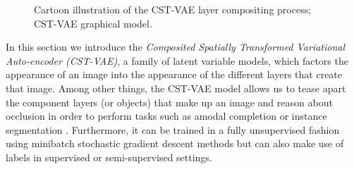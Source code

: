 \label{sec:models}\vspace{-3mm}


\begin{figure}[t]
\begin{center}
\qquad\qquad\qquad
{}\vspace{-5mm}
\end{center}
 \caption{\footnotesize {} Cartoon illustration of the CST-VAE layer compositing process; 
  CST-VAE graphical model.  
 }\vspace{-3mm}
\end{figure}


In this section we introduce the \emph{Composited Spatially Transformed Variational Auto-encoder  (CST-VAE)},
a family of latent variable models, which factors
the appearance of an image into the appearance of the different layers
that create that image.  
Among other things, the CST-VAE model allows us to tease
apart the component layers (or objects) that make up an image and
reason about occlusion in order to perform tasks such as amodal
completion 
\citep{Kar2015}
or instance segmentation
\citep{Hariharan2014}.
Furthermore, it can be trained in a fully unsupervised fashion using  minibatch stochastic
gradient descent methods but can also make use of labels in supervised or semi-supervised settings.
 

